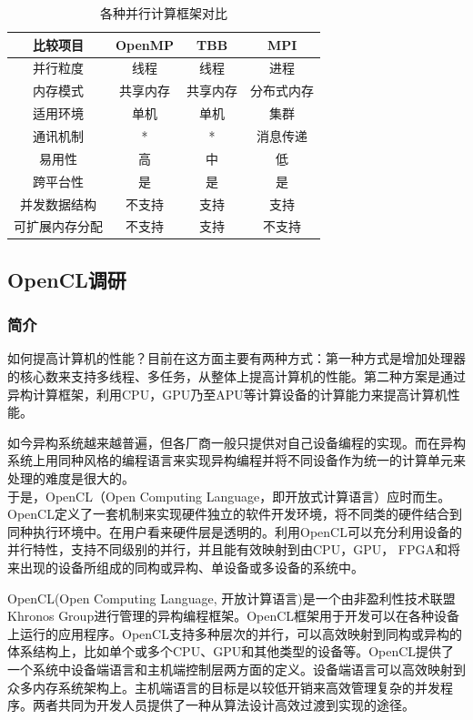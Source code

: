 \documentclass[paper=a4]{ctexart} %
\numberwithin{equation}{section} %
\numberwithin{figure}{section} %
\numberwithin{table}{section} %
\newcommand{\n}{\\\indent}
\begin{document}
\begin{table}[!hpb]
  \centering
  \begin{tabular}{|c|c|c|c|}
    \hline
    比较项目 & OpenMP & TBB & MPI \\ 
    \hline
    并行粒度 & 线程 & 线程 & 进程 \\
    内存模式 & 共享内存&共享内存&分布式内存\\
    适用环境 & 单机 & 单机 & 集群\\
    通讯机制&*&*&消息传递 \\
    易用性 & 高& 中 & 低 \\
    跨平台性 & 是&是&是\\
    并发数据结构 & 不支持 &支持&支持\\
    可扩展内存分配&不支持&支持&不支持\\
    \hline
  \end{tabular}
\caption{各种并行计算框架对比}
\end{table}

\subsection{OpenCL调研}

\subsubsection{简介}

如何提高计算机的性能？目前在这方面主要有两种方式：第一种方式是增加处理器的核心数来支持多线程、多任务，从整体上提高计算机的性能。第二种方案是通过异构计算框架，利用CPU，GPU乃至APU等计算设备的计算能力来提高计算机性能。\n

如今异构系统越来越普遍，但各厂商一般只提供对自己设备编程的实现。而在异构系统上用同种风格的编程语言来实现异构编程并将不同设备作为统一的计算单元来处理的难度是很大的。\n 
于是，OpenCL（Open Computing Language，即开放式计算语言）应时而生。OpenCL定义了一套机制来实现硬件独立的软件开发环境，将不同类的硬件结合到同种执行环境中。在用户看来硬件层是透明的。利用OpenCL可以充分利用设备的并行特性，支持不同级别的并行，并且能有效映射到由CPU，GPU， FPGA和将来出现的设备所组成的同构或异构、单设备或多设备的系统中。\n

OpenCL(Open Computing Language, 开放计算语言)是一个由非盈利性技术联盟Khronos Group进行管理的异构编程框架。OpenCL框架用于开发可以在各种设备上运行的应用程序。OpenCL支持多种层次的并行，可以高效映射到同构或异构的体系结构上，比如单个或多个CPU、GPU和其他类型的设备等。OpenCL提供了一个系统中设备端语言和主机端控制层两方面的定义。设备端语言可以高效映射到众多内存系统架构上。主机端语言的目标是以较低开销来高效管理复杂的并发程序。两者共同为开发人员提供了一种从算法设计高效过渡到实现的途径。
\end{document}
